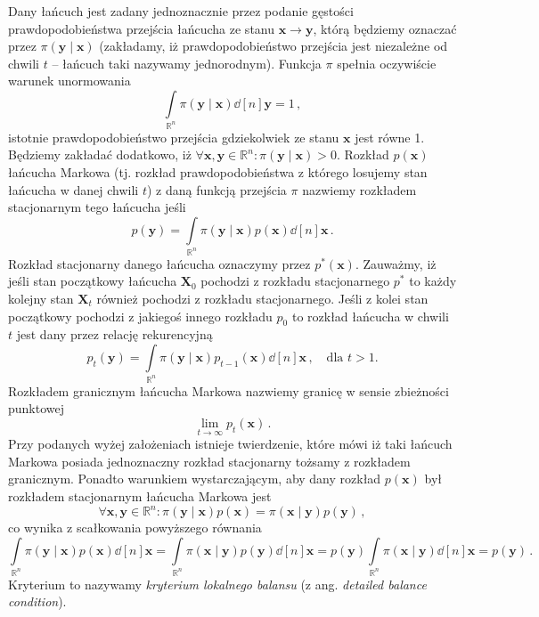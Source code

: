 \documentclass{myclass}
\numberwithin{equation}{subsection}
\begin{document}
Dany łańcuch jest zadany jednoznacznie przez podanie gęstości prawdopodobieństwa przejścia łańcucha
ze stanu \(\bm{x} \to \bm{y}\), którą będziemy oznaczać przez \(\pi(\bm{y} \mid \bm{x})\)
(zakładamy, iż prawdopodobieństwo przejścia jest niezależne od chwili \(t\) -- łańcuch taki nazywamy
jednorodnym). Funkcja \(\pi\) spełnia oczywiście warunek unormowania
\[
\int\limits_{\mathbb{R}^n} \pi(\bm{y} \mid \bm{x}) \dd[n]{\bm{y}} = 1\,,
\]
istotnie prawdopodobieństwo przejścia gdziekolwiek ze stanu \(\bm{x}\) jest równe 1. Będziemy
zakładać dodatkowo, iż \(\forall \bm{x},\bm{y}\in\mathbb{R}^n: \pi(\bm{y} \mid \bm{x}) > 0\).
Rozkład \(p(\bm{x})\) łańcucha Markowa (tj. rozkład prawdopodobieństwa z którego losujemy stan
łańcucha w danej chwili \(t\)) z daną funkcją przejścia \(\pi\) nazwiemy rozkładem stacjonarnym tego
łańcucha jeśli
\[
p(\bm{y}) = \int\limits_{\mathbb{R}^n} \pi(\bm{y} \mid \bm{x})p(\bm{x}) \dd[n]{\bm{x}}\,.
\]
Rozkład stacjonarny danego łańcucha oznaczymy przez \(p^*(\bm{x})\). Zauważmy, iż jeśli stan
początkowy łańcucha \(\bm{X}_0\) pochodzi z rozkładu stacjonarnego \(p^*\) to każdy kolejny stan
\(\bm{X}_t\) również pochodzi z rozkładu stacjonarnego. Jeśli z kolei stan początkowy pochodzi z
jakiegoś innego rozkładu \(p_0\) to rozkład łańcucha w chwili \(t\) jest dany przez relację
rekurencyjną
\[
p_t(\bm{y}) = \int\limits_{\mathbb{R}^n} \pi(\bm{y} \mid \bm{x})p_{t-1}(\bm{x}) \dd[n]{\bm{x}}\,,\quad\text{dla \(t > 1\).}
\]
Rozkładem granicznym łańcucha Markowa nazwiemy granicę w sensie zbieżności punktowej
\[
\lim_{t\to\infty} p_t(\bm{x})\,.
\]
Przy podanych wyżej założeniach istnieje twierdzenie, które mówi iż taki łańcuch Markowa posiada
jednoznaczny rozkład stacjonarny tożsamy z rozkładem granicznym. Ponadto warunkiem wystarczającym,
aby dany rozkład \(p(\bm{x})\) był rozkładem stacjonarnym łańcucha Markowa jest
\[
\forall\bm{x}, \bm{y} \in \mathbb{R}^n: \pi(\bm{y}\mid\bm{x}) p(\bm{x}) = \pi(\bm{x} \mid \bm{y}) p(\bm{y})\,,
\]
co wynika z scałkowania powyższego równania
\[
\int\limits_{\mathbb{R}^n} \pi(\bm{y}\mid\bm{x}) p(\bm{x}) \dd[n]{\bm{x}} = \int\limits_{\mathbb{R}^n} \pi(\bm{x} \mid \bm{y}) p(\bm{y}) \dd[n]{\bm{x}} = p(\bm{y}) \int\limits_{\mathbb{R}^n} \pi(\bm{x} \mid \bm{y}) \dd[n]{\bm{x}} = p(\bm{y})\,.
\]
Kryterium to nazywamy \emph{kryterium lokalnego balansu} (z ang. \textit{detailed balance
condition}).
\end{document}
